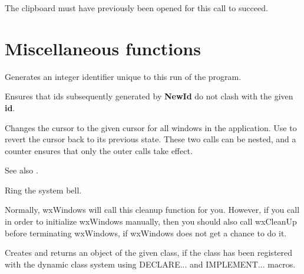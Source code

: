 The clipboard must have previously been opened for this call to succeed.

\section{Miscellaneous functions}\label{miscellany}



Generates an integer identifier unique to this run of the program.



Ensures that ids subsequently generated by {\bf NewId} do not clash with
the given {\bf id}.

\label{wxbeginbusycursor}


Changes the cursor to the given cursor for all windows in the application.
Use  to revert the cursor back
to its previous state. These two calls can be nested, and a counter
ensures that only the outer calls take effect.

See also .



Ring the system bell.

\label{wxcleanup}


Normally, wxWindows will call this cleanup function for you. However, if
you call  in order to initialize wxWindows
manually, then you should also call wxCleanUp before terminating wxWindows,
if wxWindows does not get a chance to do it.

\label{wxcreatedynamicobject}


Creates and returns an object of the given class, if the class has been
registered with the dynamic class system using DECLARE... and IMPLEMENT... macros.


